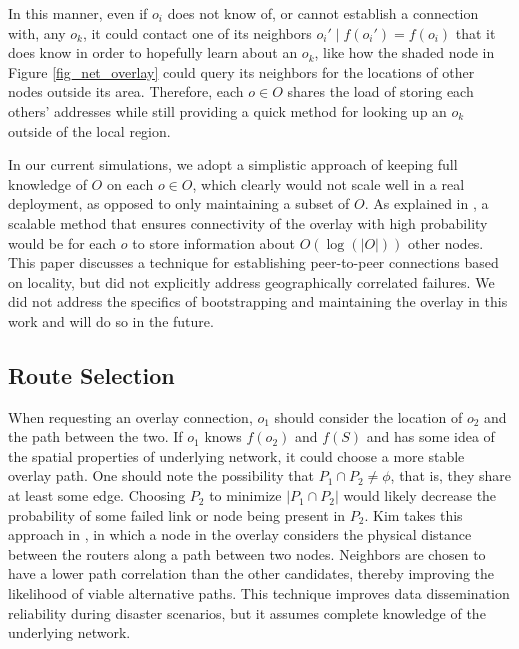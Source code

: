 \documentclass[conference]{IEEEtran}
\begin{document}
In this manner, even if $o_i$ does not know of, or cannot establish a connection with, any $o_k$, it could contact one of its neighbors $o_i' \mid f(o_i')=f(o_i)$ that it does know in order to hopefully learn about an $o_k$, like how the shaded node in Figure \ref{fig_net_overlay} could query its neighbors for the locations of other nodes outside its area.
Therefore, each $o \in O$ shares the load of storing each others' addresses while still providing a quick method for looking up an $o_k$ outside of the local region.

In our current simulations, we adopt a simplistic approach of keeping full knowledge of $O$ on each $o \in O$, which clearly would not scale well in a real deployment, as opposed to only maintaining a subset of $O$.
As explained in \cite{scamp}, a scalable method that ensures connectivity of the overlay with high probability would be for each $o$ to store information about $O(\log(|O|))$ other nodes.
This paper discusses a technique for establishing peer-to-peer connections based on locality, but did not explicitly address geographically correlated failures.
We did not address the specifics of bootstrapping and maintaining the overlay in this work and will do so in the future.


\subsection{Route Selection}
\label{route_selection}

When requesting an overlay connection, $o_1$ should consider the location of $o_2$ and the path between the two.
If $o_1$ knows $f(o_2)$ and $f(S)$ and has some idea of the spatial properties of underlying network, it could choose a more stable overlay path.
One should note the possibility that $P_1 \cap P_2 \neq \phi$, that is, they share at least some edge.
Choosing $P_2$ to minimize $|P_1 \cap P_2|$ would likely decrease the probability of some failed link or node being present in $P_2$.
Kim takes this approach in \cite{Kim2010}, in which a node in the overlay considers the physical distance between the routers along a path between two nodes.
Neighbors are chosen to have a lower path correlation than the other candidates, thereby improving the likelihood of viable alternative paths.
This technique improves data dissemination reliability during disaster scenarios, but it assumes complete knowledge of the underlying network.
\end{document}
